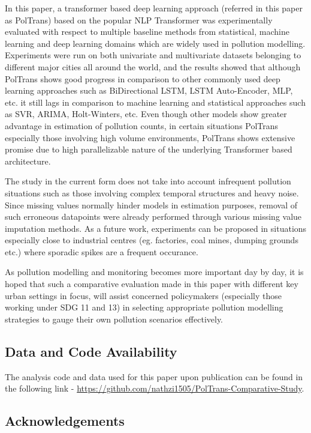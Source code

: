 \documentclass[twocolumn]{svjour3}          %
\begin{document}
In this paper, a transformer based deep learning approach (referred in this paper as {PolTrans}) based on the popular NLP Transformer was experimentally evaluated with respect to multiple baseline methods from statistical, machine learning and deep learning domains which are widely used in pollution modelling. Experiments were run on both univariate and multivariate datasets belonging to different major cities all around the world, and the results showed that although {PolTrans} shows good progress in comparison to other commonly used deep learning approaches such as BiDirectional LSTM, LSTM Auto-Encoder, MLP, etc. it still lags in comparison to machine learning and statistical approaches such as SVR, ARIMA, Holt-Winters, etc. Even though other models show greater advantage in estimation of pollution counts, in certain situations {PolTrans} especially those involving high volume environments, {PolTrans} shows extensive promise due to high parallelizable nature of the underlying Transformer based architecture.

The study in the current form does not take into account infrequent pollution situations such as those involving complex temporal structures and heavy noise. Since missing values normally hinder models in estimation purposes, removal of such erroneous datapoints were already performed through various missing value imputation methods. As a future work, experiments can be proposed in situations especially close to industrial centres (eg. factories, coal mines, dumping grounds etc.) where sporadic spikes are a frequent occurance.

As pollution modelling and monitoring becomes more important day by day, it is hoped that such a comparative evaluation made in this paper with different key urban settings in focus, will assist concerned policymakers (especially those working under SDG 11 and 13) in selecting appropriate pollution modelling strategies to gauge their own pollution scenarios effectively.

\subsection*{\textbf{Data and Code Availability}}
The analysis code and data used for this paper upon publication can be found in the following link - \url{https://github.com/nathzi1505/PolTrans-Comparative-Study}.

\subsection*{\textbf{Acknowledgements}}
\end{document}
